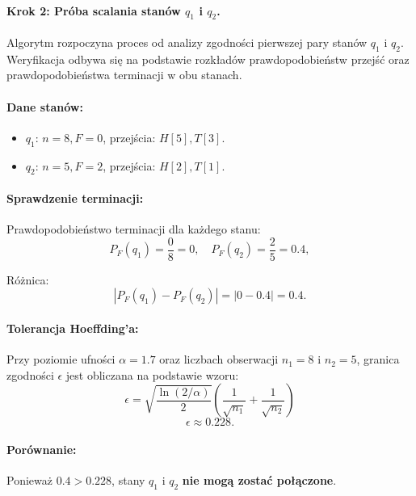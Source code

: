 \paragraph*{Krok 2: Próba scalania stanów \( q_1 \) i \( q_2 \).}  
Algorytm rozpoczyna proces od analizy zgodności pierwszej pary stanów \( q_1 \) i \( q_2 \). Weryfikacja odbywa się na podstawie rozkładów prawdopodobieństw przejść oraz prawdopodobieństwa terminacji w obu stanach.  

\paragraph*{Dane stanów:}  
\begin{itemize}  
    \item \( q_1 \): \( n = 8, F = 0 \), przejścia: \( H[5], T[3] \).  
    \item \( q_2 \): \( n = 5, F = 2 \), przejścia: \( H[2], T[1] \).  
\end{itemize}  

\paragraph*{Sprawdzenie terminacji:}  
Prawdopodobieństwo terminacji dla każdego stanu:  
\[
P_F(q_1) = \frac{0}{8} = 0, \quad P_F(q_2) = \frac{2}{5} = \num{0.4},
\]

Różnica:  
\[
|P_F(q_1) - P_F(q_2)| = |0 - \num{0.4}| = \num{0.4}.
\]

\paragraph*{Tolerancja Hoeffding’a:}  
Przy poziomie ufności \( \alpha = \num{1.7} \) oraz liczbach obserwacji \( n_1 = 8 \) i \( n_2 = 5 \), granica zgodności \( \epsilon \) jest obliczana na podstawie wzoru:  
\[
\epsilon = \sqrt{\frac{\ln(2 / \alpha)}{2}} \left( \frac{1}{\sqrt{n_1}} + \frac{1}{\sqrt{n_2}} \right)
\]
\[
\epsilon \approx \num{0.228}.
\]

\paragraph*{Porównanie:}  
Ponieważ \( \num{0.4} > \num{0.228} \), stany \( q_1 \) i \( q_2 \) \textbf{nie mogą zostać połączone}.

\paragraph*{}

